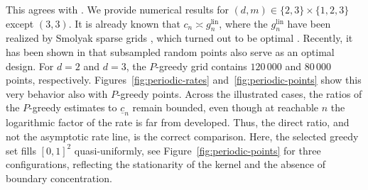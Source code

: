 \documentclass[11pt,reqno, a4paper]{article}
\numberwithin{equation}{section}
\newcommand{\lin}{\ensuremath{\mathrm{lin}}}
\begin{document}
This agrees with \cite[Thm.~3.4]{CoKuSi16}.
We provide numerical  results for $(d,m)\in\{2,3\}\times\{1,2,3\}$ except $(3,3)$.
It is already known that $c_n \asymp g_n^{\lin}$, where the $g_n^{\lin}$ have been realized by Smolyak sparse grids \cite{Bungartz_Griebel_2004}, \cite{DuTeUl16} which turned out to be optimal \cite{Te93}.
Recently, it has been shown in \cite{KPUU23} that subsampled random points also serve as an optimal design.
For $d=2$ and $d=3$, the $P$-greedy grid contains $120\,000$ and $80\,000$ points, respectively.
Figures~\ref{fig:periodic-rates} and~\ref{fig:periodic-points} show this very behavior also with $P$-greedy points.
Across the illustrated cases, the ratios of the $P$-greedy estimates to $\underline c_n$ remain bounded, even though at reachable $n$ the logarithmic factor of the rate is far from developed.
Thus, the direct ratio, and not the asymptotic rate line, is the correct comparison.
Here, the selected greedy set fills $[0,1]^2$ quasi-uniformly, see Figure~\ref{fig:periodic-points} for three configurations, reflecting the stationarity of the kernel and the absence of boundary concentration.
\end{document}
